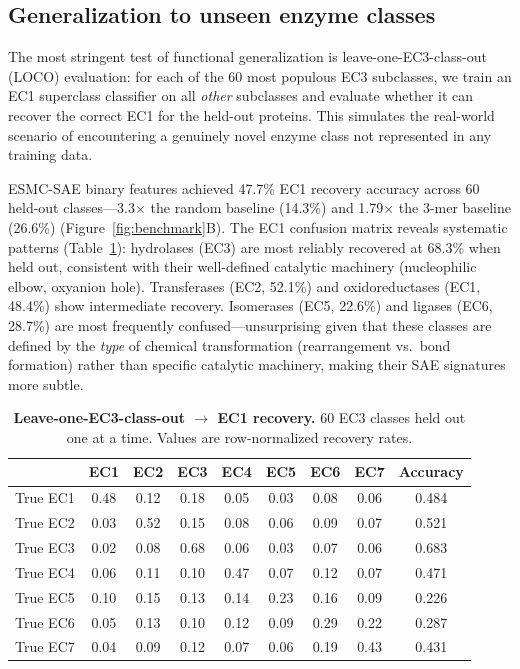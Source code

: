 \documentclass[12pt,a4paper]{article}
\begin{document}
\subsection{Generalization to unseen enzyme classes}

The most stringent test of functional generalization is leave-one-EC3-class-out (LOCO) evaluation: for each of the 60 most populous EC3 subclasses, we train an EC1 superclass classifier on all \textit{other} subclasses and evaluate whether it can recover the correct EC1 for the held-out proteins. This simulates the real-world scenario of encountering a genuinely novel enzyme class not represented in any training data.

ESMC-SAE binary features achieved 47.7\% EC1 recovery accuracy across 60 held-out classes---3.3$\times$ the random baseline (14.3\%) and 1.79$\times$ the 3-mer baseline (26.6\%) (Figure~\ref{fig:benchmark}B). The EC1 confusion matrix reveals systematic patterns (Table~\ref{tab:loco_confusion}): hydrolases (EC3) are most reliably recovered at 68.3\% when held out, consistent with their well-defined catalytic machinery (nucleophilic elbow, oxyanion hole). Transferases (EC2, 52.1\%) and oxidoreductases (EC1, 48.4\%) show intermediate recovery. Isomerases (EC5, 22.6\%) and ligases (EC6, 28.7\%) are most frequently confused---unsurprising given that these classes are defined by the \textit{type} of chemical transformation (rearrangement vs.\ bond formation) rather than specific catalytic machinery, making their SAE signatures more subtle.

\begin{table}[ht]
\centering
\caption{\textbf{Leave-one-EC3-class-out $\rightarrow$ EC1 recovery.} 60 EC3 classes held out one at a time. Values are row-normalized recovery rates.}
\label{tab:loco_confusion}
\begin{tabular}{lccccccc|c}
\toprule
& \textbf{EC1} & \textbf{EC2} & \textbf{EC3} & \textbf{EC4} & \textbf{EC5} & \textbf{EC6} & \textbf{EC7} & \textbf{Accuracy} \\
\midrule
True EC1 & 0.48 & 0.12 & 0.18 & 0.05 & 0.03 & 0.08 & 0.06 & 0.484 \\
True EC2 & 0.03 & 0.52 & 0.15 & 0.08 & 0.06 & 0.09 & 0.07 & 0.521 \\
True EC3 & 0.02 & 0.08 & 0.68 & 0.06 & 0.03 & 0.07 & 0.06 & 0.683 \\
True EC4 & 0.06 & 0.11 & 0.10 & 0.47 & 0.07 & 0.12 & 0.07 & 0.471 \\
True EC5 & 0.10 & 0.15 & 0.13 & 0.14 & 0.23 & 0.16 & 0.09 & 0.226 \\
True EC6 & 0.05 & 0.13 & 0.10 & 0.12 & 0.09 & 0.29 & 0.22 & 0.287 \\
True EC7 & 0.04 & 0.09 & 0.12 & 0.07 & 0.06 & 0.19 & 0.43 & 0.431 \\
\bottomrule
\end{tabular}
\end{table}
\end{document}
